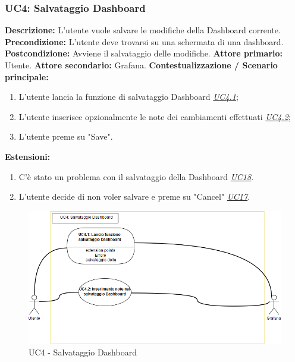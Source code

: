                     
                    
                \subsubsection{UC4: Salvataggio Dashboard}
                    \textbf{Descrizione:} L’utente vuole salvare le modifiche della Dashboard corrente.
                    \newline
                    \textbf{Precondizione:} L'utente deve trovarsi su una schermata di una dashboard.
                    \newline
                    \textbf{Postcondizione:} Avviene il salvataggio delle modifiche.
                    \newline
                    \textbf{Attore primario:} Utente.
                    \newline
                    \textbf{Attore secondario:} Grafana.
                    \newline
                    \textbf{Contestualizzazione / Scenario principale:} \begin{enumerate}
                        \item L'utente lancia la funzione di salvataggio Dashboard \underline{\textit{UC4.1}};
                        \item L'utente inserisce opzionalmente le note dei cambiamenti effettuati \underline{\textit{UC4.2}};
                        \item L'utente preme su "Save".
                    \end{enumerate}
                    \textbf{Estensioni:} \begin{enumerate}
                            \item C’è stato un problema con il salvataggio della Dashboard \underline{\textit{UC18}}.
                            \item L'utente decide di non voler salvare e preme su "Cancel" \underline{\textit{UC17}}.
                        \end{enumerate}
                \clearpage
                \begin{figure}[!htbp]
                    	\centering
                    	\includegraphics[width=\textwidth]{UC4.png}
                    	\caption{UC4 - Salvataggio Dashboard}
                    	\label{uc4}
                    \end{figure}   
                
